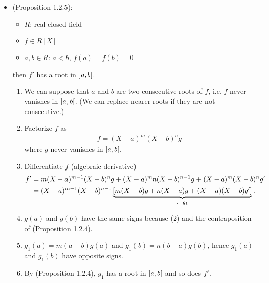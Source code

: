 \documentclass[9pt]{ltjsarticle}
\begin{document}
\begin{itemize}
\begin{enumerate}
  \end{enumerate}
  \item
  (Proposition 1.2.5):
  \begin{itemize}
    \item $R$: real closed field
    \item $f\in R[X]$
    \item $a,b \in R$: $a<b$, $f(a)=f(b)=0$
  \end{itemize}
  then $f'$ has a root in $\left] a,b \right[$.

  \pf
  \begin{enumerate}
    \item We can suppose that $a$ and $b$ are two consecutive roots of $f$,
    i.e. $f$ never vanishes in $\left] a,b \right[$.
    (We can replace nearer roots if they are not consecutive.)
    \item
    Factorize $f$ as
    \begin{align}
      f = (X-a)^m (X-b)^n g
    \end{align}
    where $g$ never vanishes in $\left] a,b \right[$.
    \item
    Differentiate $f$ (algebraic derivative)
    \begin{align}
      f'
      &=
      m(X-a)^{m-1}(X-b)^n g + (X-a)^m n(X-b)^{n-1}g + (X-a)^m (X-b)^n g'\\
      &=
      (X-a)^{m-1}(X-b)^{n-1}\underbrace{[m(X-b)g + n(X-a)g + (X-a)(X-b)g']}_{:= g_1}.
    \end{align}
    \item
    $g(a)$ and $g(b)$ have the same signs because (2) and the contraposition of (Proposition 1.2.4).
    \item
    $g_1(a)=m(a-b)g(a)$ and $g_1(b)=n(b-a)g(b)$,
    hence $g_1(a)$ and $g_1(b)$ have opposite signs.
    \item
    By (Proposition 1.2.4), $g_1$ has a root in $\left] a,b \right[$ and
    so does $f'$.


\end{enumerate}
\end{itemize}
\end{document}
